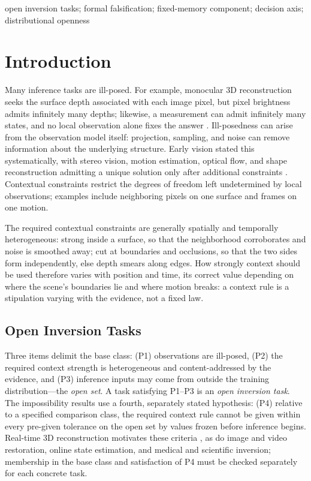 \documentclass[twoside,11pt]{article}
\begin{document}
\begin{keywords}
  open inversion tasks; formal falsification; fixed-memory component; decision axis; distributional openness
\end{keywords}

\section{Introduction}
\label{ch:intro}%

Many inference tasks are ill-posed. For example, monocular 3D reconstruction seeks the surface depth associated with each image pixel, but pixel brightness admits infinitely many depths; likewise, a measurement can admit infinitely many states, and no local observation alone fixes the answer \citep{hadamard1902}. Ill-posedness can arise from the observation model itself: projection, sampling, and noise can remove information about the underlying structure. Early vision stated this systematically, with stereo vision, motion estimation, optical flow, and shape reconstruction admitting a unique solution only after additional constraints \citep{poggio1985}. Contextual constraints restrict the degrees of freedom left undetermined by local observations; examples include neighboring pixels on one surface and frames on one motion.

The required contextual constraints are generally spatially and temporally heterogeneous: strong inside a surface, so that the neighborhood corroborates and noise is smoothed away; cut at boundaries and occlusions, so that the two sides form independently, else depth smears along edges. How strongly context should be used therefore varies with position and time, its correct value depending on where the scene's boundaries lie and where motion breaks: a context rule is a stipulation varying with the evidence, not a fixed law.

\subsection{Open Inversion Tasks}

Three items delimit the base class: (P1) observations are ill-posed, (P2) the required context strength is heterogeneous and content-addressed by the evidence, and (P3) inference inputs may come from outside the training distribution---the \emph{open set}. A task satisfying P1--P3 is an \emph{open inversion task}. The impossibility results use a fourth, separately stated hypothesis: (P4) relative to a specified comparison class, the required context rule cannot be given within every pre-given tolerance on the open set by values frozen before inference begins. Real-time 3D reconstruction motivates these criteria \citep{kerbl2023}, as do image and video restoration, online state estimation, and medical and scientific inversion; membership in the base class and satisfaction of P4 must be checked separately for each concrete task.
\end{document}
